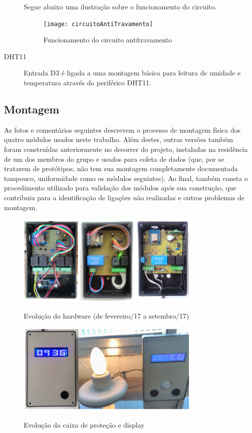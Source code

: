 \begin{description}
Segue abaixo uma ilustração sobre o funcionamento do circuito.

\begin{figure}[H]
	\centering
	\caption{Funcionamento do circuito antitravamento}
  \texttt{[image: circuitoAntiTravamento]}
\label{fig:circuitoAntiTravamento}
\end{figure}

\item [DHT11] Entrada D3 é ligada a uma montagem básica para leitura de umidade e temperatura através do periférico DHT11.

\end{description}

\subsection {Montagem}

As fotos e comentários seguintes descrevem o processo de montagem física dos quatro módulos usados neste trabalho. Além destes, outras versões também foram construídas anteriormente no decorrer do projeto, instaladas na residência de um dos membros do grupo e usados para coleta de dados (que, por se tratarem de protótipos, não tem sua montagem completamente documentada tampouco, uniformidade como os módulos seguintes).
Ao final, também consta o procedimento utilizado para validação dos módulos após sua construção, que contribuiu para a identificação de ligações não realizadas e outros problemas de montagem.

\begin{figure}[H]
	\centering
	\caption{Evolução do hardware (de fevereiro/17 a setembro/17)}
	\includegraphics[width=0.8\textwidth]{evolHW}
	\label{fig:evolHW}
\end{figure}

\begin{figure}[H]
	\centering
	\caption{Evolução da caixa de proteção e display}
	\includegraphics[width=0.8\textwidth]{evolProtDisplay}
	\label{fig:evolProtDisplay}
\end{figure}

